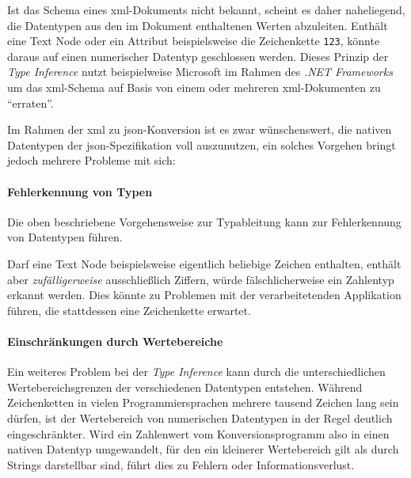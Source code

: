 Ist das Schema eines \acrshort{xml}-Dokuments nicht bekannt, scheint es daher naheliegend, die Datentypen aus den im Dokument enthaltenen Werten abzuleiten. Enthält eine Text Node oder ein Attribut beispielsweise die Zeichenkette \texttt{123}, könnte daraus auf einen numerischer Datentyp geschlossen werden. Dieses Prinzip der \emph{Type Inference} nutzt beispielweise Microsoft im Rahmen des \emph{.NET Frameworks} um das \acrshort{xml}-Schema auf Basis von einem oder mehreren \acrshort{xml}-Dokumenten zu \enquote{erraten}.~\cite{msdn2017inferxmlschema}

Im Rahmen der \acrshort{xml} zu \acrshort{json}-Konversion ist es zwar wünschenswert, die nativen Datentypen der \acrshort{json}-Spezifikation voll auszunutzen, ein solches Vorgehen bringt jedoch mehrere Probleme mit sich:

\paragraph{Fehlerkennung von Typen}

Die oben beschriebene Vorgehensweise zur Typableitung kann zur Fehlerkennung von Datentypen führen.

Darf eine Text Node beispielsweise eigentlich beliebige Zeichen enthalten, enthält aber \emph{zufälligerweise} ausschließlich Ziffern, würde fälschlicherweise ein Zahlentyp erkannt werden. Dies könnte zu Problemen mit der verarbeitetenden Applikation führen, die stattdessen eine Zeichenkette erwartet.

\paragraph{Einschränkungen durch Wertebereiche}

Ein weiteres Problem bei der \emph{Type Inference} kann durch die unterschiedlichen Wertebereichsgrenzen der verschiedenen Datentypen entstehen.  Während Zeichenketten in vielen Programmiersprachen mehrere tausend Zeichen lang sein dürfen, ist der Wertebereich von numerischen Datentypen in der Regel deutlich eingeschränkter. Wird ein Zahlenwert vom Konversionsprogramm also in einen nativen Datentyp umgewandelt, für den ein kleinerer Wertebereich gilt als durch Strings darstellbar sind, führt dies zu Fehlern oder Informationsverlust.

